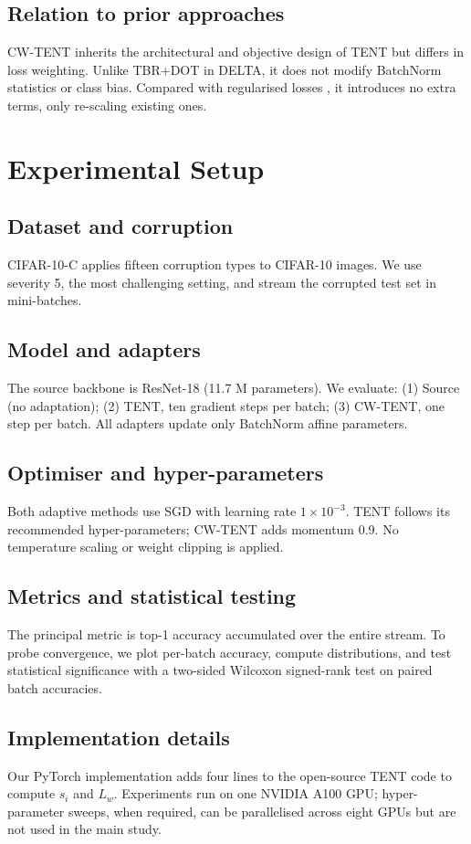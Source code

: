 \documentclass{article} %
\begin{document}
\subsection{Relation to prior approaches}
CW-TENT inherits the architectural and objective design of TENT but differs in loss weighting. Unlike TBR+DOT in DELTA, it does not modify BatchNorm statistics or class bias. Compared with regularised losses \cite{author-year-test}, it introduces no extra terms, only re-scaling existing ones.

\section{Experimental Setup}
\label{sec:experimental}
\subsection{Dataset and corruption}
CIFAR-10-C applies fifteen corruption types to CIFAR-10 images. We use severity 5, the most challenging setting, and stream the corrupted test set in mini-batches.

\subsection{Model and adapters}
The source backbone is ResNet-18 (11.7 M parameters). We evaluate: (1) Source (no adaptation); (2) TENT, ten gradient steps per batch; (3) CW-TENT, one step per batch. All adapters update only BatchNorm affine parameters.

\subsection{Optimiser and hyper-parameters}
Both adaptive methods use SGD with learning rate \(1\times 10^{-3}\). TENT follows its recommended hyper-parameters; CW-TENT adds momentum 0.9. No temperature scaling or weight clipping is applied.

\subsection{Metrics and statistical testing}
The principal metric is top-1 accuracy accumulated over the entire stream. To probe convergence, we plot per-batch accuracy, compute distributions, and test statistical significance with a two-sided Wilcoxon signed-rank test on paired batch accuracies.

\subsection{Implementation details}
Our PyTorch implementation adds four lines to the open-source TENT code to compute \(s_{i}\) and \(L_{w}\). Experiments run on one NVIDIA A100 GPU; hyper-parameter sweeps, when required, can be parallelised across eight GPUs but are not used in the main study.
\end{document}
